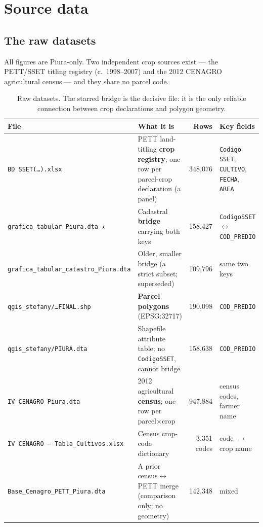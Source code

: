 \documentclass[11pt,a4paper]{article}
\begin{document}
\section{Source data}
\label{sec:raw}

\subsection{The raw datasets}

All figures are Piura-only. Two independent crop sources exist --- the PETT/SSET titling
registry (c.~1998--2007) and the 2012 CENAGRO agricultural census --- and they share no parcel
code.

\begin{table}[ht]
\centering\small
\caption{Raw datasets. The starred bridge is the decisive file: it is the only reliable
connection between crop declarations and polygon geometry.}
\begin{tabular}{@{}p{4.6cm}p{6.2cm}rp{3.2cm}@{}}
\toprule
File & What it is & Rows & Key fields \\
\midrule
\texttt{BD SSET(\ldots).xlsx} & PETT land-titling \textbf{crop registry}; one row per
parcel-crop declaration (a panel) & 348{,}076 & \texttt{Codigo SSET}, \texttt{CULTIVO},
\texttt{FECHA}, \texttt{AREA} \\
\texttt{grafica\_tabular\_Piura.dta}~$\star$ & Cadastral \textbf{bridge} carrying both keys &
158{,}427 & \texttt{CodigoSSET} $\leftrightarrow$ \texttt{COD\_PREDIO} \\
\texttt{grafica\_tabular\_catastro\_Piura.dta} & Older, smaller bridge (a strict subset;
superseded) & 109{,}796 & same two keys \\
\texttt{qgis\_stefany/\ldots FINAL.shp} & \textbf{Parcel polygons} (EPSG:32717) & 190{,}098 &
\texttt{COD\_PREDIO} \\
\texttt{qgis\_stefany/PIURA.dta} & Shapefile attribute table; no \texttt{CodigoSSET}, cannot
bridge & 158{,}638 & \texttt{COD\_PREDIO} \\
\texttt{IV\_CENAGRO\_Piura.dta} & 2012 agricultural \textbf{census}; one row per
parcel$\times$crop & 947{,}884 & census codes, farmer name \\
\texttt{IV CENAGRO -- Tabla\_Cultivos.xlsx} & Census crop-code dictionary & 3{,}351 codes &
code $\to$ crop name \\
\texttt{Base\_Cenagro\_PETT\_Piura.dta} & A prior census$\leftrightarrow$PETT merge (comparison
only; no geometry) & 142{,}348 & mixed \\
\bottomrule
\end{tabular}
\end{table}
\end{document}
